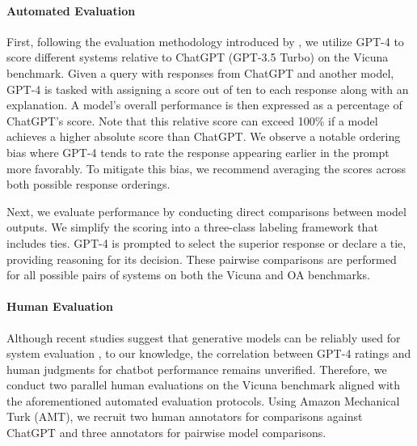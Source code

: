 \paragraph{Automated Evaluation} First, following the evaluation methodology introduced by \citet{vicuna2023}, we utilize GPT-4 to score different systems relative to ChatGPT (GPT-3.5 Turbo) on the Vicuna benchmark. Given a query with responses from ChatGPT and another model, GPT-4 is tasked with assigning a score out of ten to each response along with an explanation. A model’s overall performance is then expressed as a percentage of ChatGPT’s score. Note that this relative score can exceed 100\% if a model achieves a higher absolute score than ChatGPT. We observe a notable ordering bias where GPT-4 tends to rate the response appearing earlier in the prompt more favorably. To mitigate this bias, we recommend averaging the scores across both possible response orderings.

Next, we evaluate performance by conducting direct comparisons between model outputs. We simplify the scoring into a three-class labeling framework that includes ties. GPT-4 is prompted to select the superior response or declare a tie, providing reasoning for its decision. These pairwise comparisons are performed for all possible pairs of systems on both the Vicuna and OA benchmarks.

\paragraph{Human Evaluation} Although recent studies suggest that generative models can be reliably used for system evaluation \citep{fu2023gptscore}, to our knowledge, the correlation between GPT-4 ratings and human judgments for chatbot performance remains unverified. Therefore, we conduct two parallel human evaluations on the Vicuna benchmark aligned with the aforementioned automated evaluation protocols. Using Amazon Mechanical Turk (AMT), we recruit two human annotators for comparisons against ChatGPT and three annotators for pairwise model comparisons.

